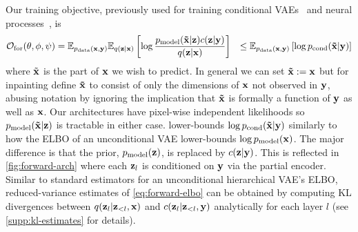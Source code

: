 Our training objective, previously used for training conditional
VAEs~\citep{sohn2015learning,ivanov2018variational} and neural
processes~\citep{garnelo2018neural}, is
\begin{align}
  \label{eq:forward-elbo}
  \mathcal{O}_\mathrm{for}(\theta, \phi, \psi{}) &= \mathbb{E}_{p_{\rm{data}}{}(\mathbf{x}{}, \mathbf{y}{})} \mathbb{E}_{q(\mathbf{z}{}|\mathbf{x}{})} \left[ \log \frac{p_{\rm{model}}{}(\mathbf{\tilde{x}}{}|\mathbf{z}{})c{}(\mathbf{z}{}|\mathbf{y}{})}{q(\mathbf{z}{}|\mathbf{x}{})} \right] &\leq \mathbb{E}_{p_{\rm{data}}{}(\mathbf{x}{}, \mathbf{y}{})} \left[ \log p_{\text{cond}}{}(\mathbf{\tilde{x}}{}|\mathbf{y}{}) \right]
\end{align}
where $\tilde{\mathbf{x}{}}$ is the part of $\mathbf{x}{}$ we wish to predict. In general we can
set $\mathbf{\tilde{x}}{}:=\mathbf{x}{}$ but for inpainting define $\mathbf{\tilde{x}}{}$ to consist of only
the dimensions of $\mathbf{x}{}$ not observed in $\mathbf{y}{}$, abusing notation by
ignoring the implication that $\mathbf{\tilde{x}}{}$ is formally a function of $\mathbf{y}{}$
as well as $\mathbf{x}{}$. Our architectures have pixel-wise independent
likelihoods so $p_{\rm{model}}{}(\mathbf{\tilde{x}}{}|\mathbf{z}{})$ is tractable in either case. 
lower-bounds $\log p_{\text{cond}}{}(\mathbf{\tilde{x}}{}|\mathbf{y}{}) $ similarly to how the ELBO of
an unconditional VAE lower-bounds $\log p_{\rm{model}}{}(\mathbf{x}{})$. The major difference
is that the prior, $p_{\rm{model}}{}(\mathbf{z}{})$, is replaced by $c{}(\mathbf{z}{}|\mathbf{y}{})$.
This is reflected in \cref{fig:forward-arch} where each $\mathbf{z}{}_l$ is conditioned
on $\mathbf{y}{}$ via the partial encoder.
%
Similar to standard estimators for an unconditional hierarchical VAE's ELBO,
reduced-variance estimates of \cref{eq:forward-elbo} can be obtained by
computing KL divergences between $q(\mathbf{z}{}_l|\mathbf{z}{}_{<l},\mathbf{x}{})$ and
$c{}(\mathbf{z}{}_l|\mathbf{z}{}_{<l},\mathbf{y}{})$ analytically for each layer $l$ (see
\cref{supp:kl-estimates} for details).

